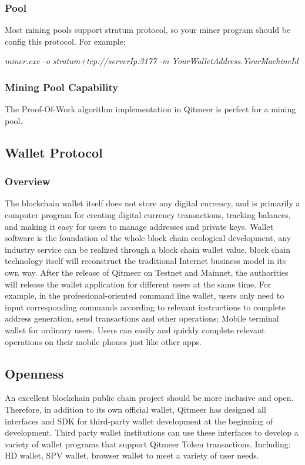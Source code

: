 \documentclass[a4paper,11pt]{article}
\begin{document}
\subsubsection*{Pool}
Most mining pools support stratum protocol, so your miner program should be config this protocol. 
For example:

\emph{miner.exe -o stratum+tcp://serverIp:3177 -m YourWalletAddress.YourMachineId}

\subsubsection{Mining Pool Capability}
The Proof-Of-Work algorithm implementation in Qitmeer is perfect for a mining pool.


\subsection{Wallet Protocol}
\subsubsection{Overview}
   The blockchain wallet itself does not store any digital currency, and is primarily a computer program for creating digital currency transactions, tracking balances, and making it easy for users to manage addresses and private keys. Wallet software is the foundation of the whole block chain ecological development, any industry service can be realized through a block chain wallet value, block chain technology itself will reconstruct the traditional Internet business model in its own way. After the release of Qitmeer on Testnet and Mainnet, the authorities will release the wallet application for different users at the same time. For example, in the professional-oriented command line wallet, users only need to input corresponding commands according to relevant instructions to complete address generation, send transactions and other operations; Mobile terminal wallet for ordinary users. Users can easily and quickly complete relevant operations on their mobile phones just like other apps.
\subsection*{Openness}
   An excellent blockchain public chain project should be more inclusive and open. Therefore, in addition to its own official wallet, Qitmeer has designed all interfaces and SDK for third-party wallet development at the beginning of development. Third party wallet institutions can use these interfaces to develop a variety of wallet programs that support Qitmeer Token transactions. Including: HD wallet, SPV wallet, browser wallet to meet a variety of user needs.
\end{document}
